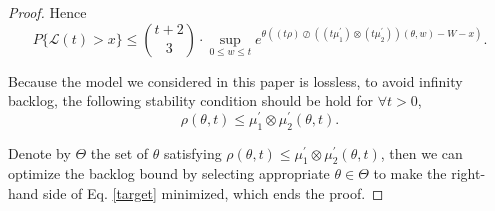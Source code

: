 \documentclass[12pt]{article}
\newtheorem{proof}{Proof}
\begin{document}
\begin{proof}
Hence
\begin{equation}\label{target}
P\{\mathcal{L}(t)>x\}\leq {t+2\choose 3}\cdot \sup_{0\leq w\leq t}e^{\theta((t\rho)\oslash((t\mu_1^\prime)\otimes(t\mu_2^\prime))(\theta,w)-W-x)}.
\end{equation}

Because the model we considered in this paper is lossless, to avoid infinity backlog, the following stability condition should be hold for $\forall t>0$,
$$\rho(\theta,t)\leq \mu_1^\prime\otimes\mu_2^\prime(\theta,t).$$

Denote by $\Theta$ the set of $\theta$ satisfying $\rho(\theta,t)\leq \mu_1^\prime\otimes\mu_2^\prime(\theta,t)$, then we can optimize the backlog bound by selecting appropriate $\theta\in\Theta$ to make the right-hand side of Eq. \ref{target} minimized, which ends the proof.
\end{proof}
\end{document}

